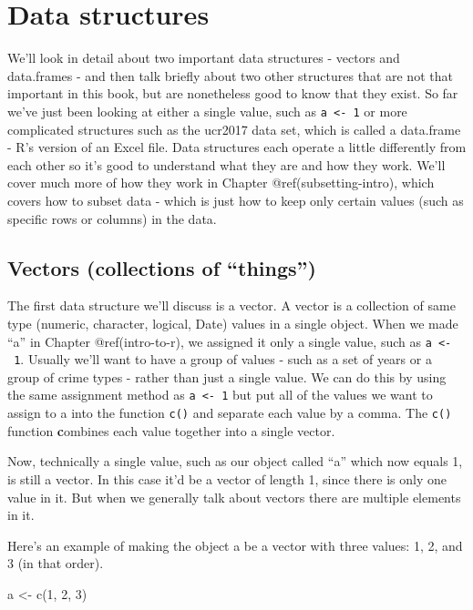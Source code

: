 \documentclass[
  a4paper,
]{krantz}
\makeatletter
\newenvironment{Shaded}{\begin{snugshade}}{\end{snugshade}}
\newcommand{\DecValTok}[1]{\textcolor[rgb]{0.00,0.00,0.81}{#1}}
\newcommand{\FunctionTok}[1]{\textcolor[rgb]{0.00,0.00,0.00}{#1}}
\newcommand{\NormalTok}[1]{#1}
\newcommand{\OtherTok}[1]{\textcolor[rgb]{0.56,0.35,0.01}{#1}}
\newenvironment{kframe}{%
\medskip{}
\setlength{\fboxsep}{.8em}
 \def\at@end@of@kframe{}%
 \ifinner\ifhmode%
  \def\at@end@of@kframe{\end{minipage}}%
  \begin{minipage}{\columnwidth}%
 \fi\fi%
 \def\FrameCommand##1{\hskip\@totalleftmargin \hskip-\fboxsep
 \colorbox{shadecolor}{##1}\hskip-\fboxsep
     \hskip-\linewidth \hskip-\@totalleftmargin \hskip\columnwidth}%
 \MakeFramed {\advance\hsize-\width
   \@totalleftmargin\z@ \linewidth\hsize
   \@setminipage}}%
 {\par\unskip\endMakeFramed%
 \at@end@of@kframe}
\renewenvironment{Shaded}{\begin{kframe}}{\end{kframe}}
\makeatother
\begin{document}
\hypertarget{data-structures}{%
\section{Data structures}\label{data-structures}}

We'll look in detail about two important data structures -
vectors and data.frames - and then talk briefly about two
other structures that are not that important in this book,
but are nonetheless good to know that they exist. So far
we've just been looking at either a single value, such as
\texttt{a\ \textless{}-\ 1} or more complicated structures
such as the ucr2017 data set, which is called a data.frame -
R's version of an Excel file. Data structures each operate a
little differently from each other so it's good to
understand what they are and how they work. We'll cover much
more of how they work in Chapter @ref(subsetting-intro),
which covers how to subset data - which is just how to keep
only certain values (such as specific rows or columns) in
the data.

\hypertarget{vectors}{%
\subsection{Vectors (collections of
``things'')}\label{vectors}}

The first data structure we'll discuss is a vector. A vector
is a collection of same type (numeric, character, logical,
Date) values in a single object. When we made ``a'' in
Chapter @ref(intro-to-r), we assigned it only a single
value, such as \texttt{a\ \textless{}-\ 1}. Usually we'll
want to have a group of values - such as a set of years or a
group of crime types - rather than just a single value. We
can do this by using the same assignment method as
\texttt{a\ \textless{}-\ 1} but put all of the values we
want to assign to a into the function \texttt{c()} and
separate each value by a comma. The \texttt{c()} function
\textbf{c}ombines each value together into a single vector.

Now, technically a single value, such as our object called
``a'' which now equals 1, is still a vector. In this case
it'd be a vector of length 1, since there is only one value
in it. But when we generally talk about vectors there are
multiple elements in it.

Here's an example of making the object a be a vector with
three values: 1, 2, and 3 (in that order).

\begin{Shaded}
\begin{Highlighting}[]
\NormalTok{a }\OtherTok{\textless{}{-}} \FunctionTok{c}\NormalTok{(}\DecValTok{1}\NormalTok{, }\DecValTok{2}\NormalTok{, }\DecValTok{3}\NormalTok{)}
\end{Highlighting}
\end{Shaded}
\end{document}
